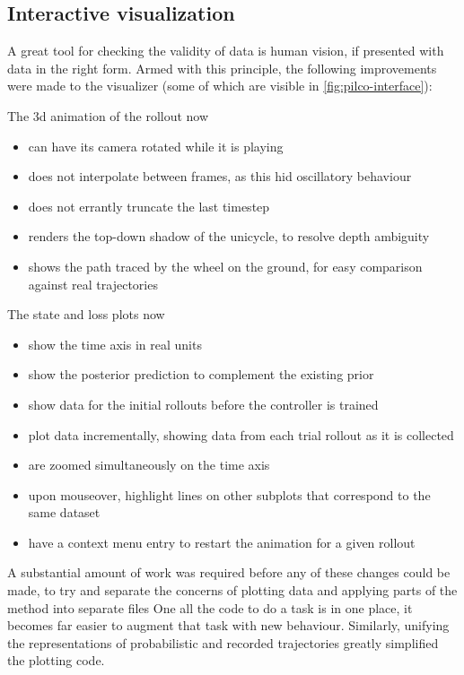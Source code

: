 \documentclass[main.tex]{subfiles}
\begin{document}
\subsection{Interactive visualization}
	\label{sec:visualization}

	A great tool for checking the validity of data is human vision, if presented with data in the right form.
	Armed with this principle, the following improvements were made to the visualizer (some of which are visible in \cref{fig:pilco-interface}):
	\begin{multicols}{2}
		\raggedcolumns
		\noindent
		The 3d animation of the rollout now
		\begin{itemize}[nosep]
			\item can have its camera rotated while it is playing
			\item does not interpolate between frames, as this hid oscillatory behaviour
			\item does not errantly truncate the last timestep
			\item renders the top-down shadow of the unicycle, to resolve depth ambiguity
			\item shows the path traced by the wheel on the ground, for easy comparison against real trajectories
		\end{itemize}
		\columnbreak
		\noindent
		The state and loss plots now
		\begin{itemize}[nosep]
			\item show the time axis in real units
			\item show the posterior prediction to complement the existing prior
			\item show data for the initial rollouts before the controller is trained
			\item plot data incrementally, showing data from each trial rollout as it is collected
			\item are zoomed simultaneously on the time axis
			\item upon mouseover, highlight lines on other subplots that correspond to the same dataset
			\item have a context menu entry to restart the animation for a given rollout
		\end{itemize}
	\end{multicols}

	A substantial amount of work was required before any of these changes could be made, to try and separate the concerns of plotting data and applying parts of the {\Pilco} method into separate files
	One all the code to do a task is in one place, it becomes far easier to augment that task with new behaviour.
	Similarly, unifying the representations of probabilistic and recorded trajectories greatly simplified the plotting code.
\end{document}
